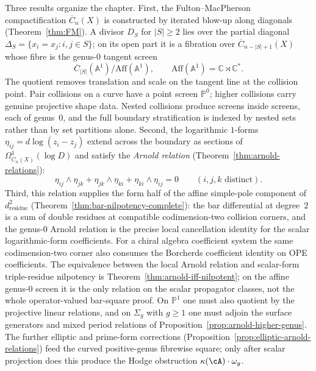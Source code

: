 Three results organize the chapter. First, the
Fulton--MacPherson compactification $\overline{C}_n(X)$ is
constructed by iterated blow-up along diagonals
(Theorem~\ref{thm:FM}). A divisor $D_S$ for $|S|\geq2$ lies over the
partial diagonal
$\Delta_S=\{x_i=x_j:i,j\in S\}$; on its open part it is a fibration
over $\overline C_{n-|S|+1}(X)$ whose fibre is the genus-$0$ tangent
screen
\[
 \overline C_{|S|}(\mathbb A^1)/
 \mathrm{Aff}(\mathbb A^1),
\qquad
\mathrm{Aff}(\mathbb A^1)=\mathbb C\rtimes\mathbb C^*.
\]
The quotient removes translation and scale on the tangent line at the
collision point. Pair collisions on a curve have a point screen
$\mathbb P^0$; higher collisions carry genuine projective shape data.
Nested collisions produce screens inside screens, each of genus~$0$,
and the full boundary stratification is indexed by nested sets rather
than by set partitions alone. Second, the logarithmic
$1$-forms $\eta_{ij} = d\log(z_i - z_j)$ extend across the
boundary as sections of
$\Omega^1_{\overline{C}_n(X)}(\log D)$ and satisfy the
\emph{Arnold relation}
(Theorem~\ref{thm:arnold-relations}):
\begin{equation}\tag{$\star$}
\eta_{ij} \wedge \eta_{jk}
+ \eta_{jk} \wedge \eta_{ki}
+ \eta_{ki} \wedge \eta_{ij} = 0
\qquad (i,j,k \text{ distinct}).
\end{equation}
Third, this relation supplies the form half of the affine simple-pole
component of $d_{\mathrm{residue}}^2$
(Theorem~\ref{thm:bar-nilpotency-complete}): the
bar differential at degree~$2$ is a sum of double residues
at compatible codimension-two collision corners, and
the genus-$0$ Arnold relation is the precise local cancellation identity
for the scalar logarithmic-form coefficients. For a chiral algebra
coefficient system the same codimension-two corner also consumes the
Borcherds coefficient identity on OPE coefficients. The equivalence between
the local Arnold relation and scalar-form triple-residue nilpotency is
Theorem~\ref{thm:arnold-iff-nilpotent}; on the affine genus-$0$ screen
it is the only relation on the scalar propagator classes, not the whole
operator-valued bar-square proof. On
$\mathbb{P}^1$ one must also quotient by the projective linear
relations, and on $\Sigma_g$ with $g \geq 1$ one must adjoin the
surface generators and mixed period relations of
Proposition~\ref{prop:arnold-higher-genus}. The further elliptic and
prime-form corrections
(Proposition~\ref{prop:elliptic-arnold-relations}) feed the curved
positive-genus fibrewise square; only after scalar projection does this
produce the Hodge obstruction
$\kappa(\cA) \cdot \omega_g$.

